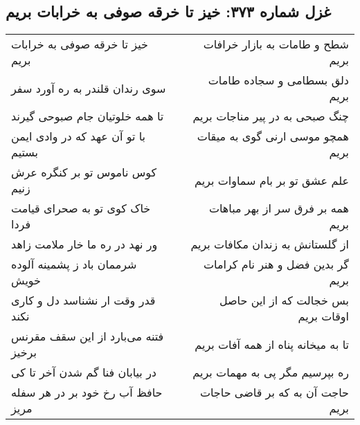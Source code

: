 \begin{center}
\section*{غزل شماره ۳۷۳: خیز تا خرقه صوفی به خرابات بریم}
\label{sec:sh373}
\begin{longtable}{l p{0.5cm} r}
خیز تا خرقه صوفی به خرابات بریم
&&
شطح و طامات به بازار خرافات بریم
\\
سوی رندان قلندر به ره آورد سفر
&&
دلق بسطامی و سجاده طامات بریم
\\
تا همه خلوتیان جام صبوحی گیرند
&&
چنگ صبحی به در پیر مناجات بریم
\\
با تو آن عهد که در وادی ایمن بستیم
&&
همچو موسی ارنی گوی به میقات بریم
\\
کوس ناموس تو بر کنگره عرش زنیم
&&
علم عشق تو بر بام سماوات بریم
\\
خاک کوی تو به صحرای قیامت فردا
&&
همه بر فرق سر از بهر مباهات بریم
\\
ور نهد در ره ما خار ملامت زاهد
&&
از گلستانش به زندان مکافات بریم
\\
شرممان باد ز پشمینه آلوده خویش
&&
گر بدین فضل و هنر نام کرامات بریم
\\
قدر وقت ار نشناسد دل و کاری نکند
&&
بس خجالت که از این حاصل اوقات بریم
\\
فتنه می‌بارد از این سقف مقرنس برخیز
&&
تا به میخانه پناه از همه آفات بریم
\\
در بیابان فنا گم شدن آخر تا کی
&&
ره بپرسیم مگر پی به مهمات بریم
\\
حافظ آب رخ خود بر در هر سفله مریز
&&
حاجت آن به که بر قاضی حاجات بریم
\\
\end{longtable}
\end{center}
